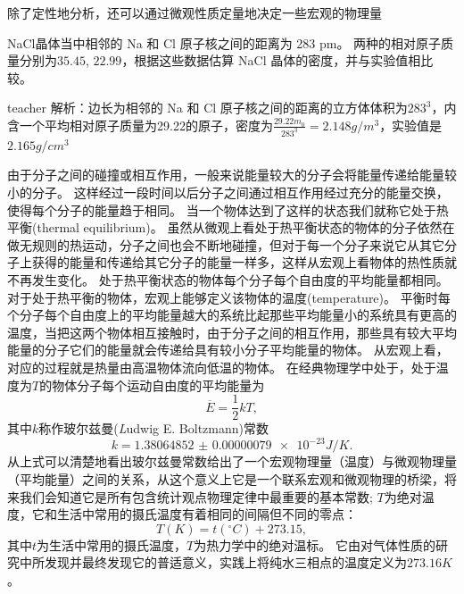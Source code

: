 除了定性地分析，还可以通过微观性质定量地决定一些宏观的物理量
\begin{example}
NaCl晶体当中相邻的 Na 和 Cl 原子核之间的距离为 283 pm。
两种的相对原子质量分别为$35.45$, $22.99$，根据这些数据估算 NaCl 晶体的密度，并与实验值相比较。
\begin{taggedblock}{teacher}
\newline
解析：边长为相邻的 Na 和 Cl 原子核之间的距离的立方体体积为$283^3$，内含一个平均相对原子质量为29.22的原子，密度为$\frac{29.22m_0}{283^3}=2.148g/m^3$，实验值是$2.165g/cm^3$
\end{taggedblock}
\end{example}

由于分子之间的碰撞或相互作用，一般来说能量较大的分子会将能量传递给能量较小的分子。
这样经过一段时间以后分子之间通过相互作用经过充分的能量交换，使得每个分子的能量趋于相同。
当一个物体达到了这样的状态我们就称它处于{\heiti 热平衡}(thermal equilibrium)。
虽然从微观上看处于热平衡状态的物体的分子依然在做无规则的热运动，分子之间也会不断地碰撞，但对于每一个分子来说它从其它分子上获得的能量和传递给其它分子的能量一样多，这样从宏观上看物体的热性质就不再发生变化。
处于热平衡状态的物体每个分子每个自由度的平均能量都相同。
对于处于热平衡的物体，宏观上能够定义该物体的{\heiti 温度}(temperature)。
平衡时每个分子每个自由度上的平均能量越大的系统比起那些平均能量小的系统具有更高的温度，当把这两个物体相互接触时，由于分子之间的相互作用，那些具有较大平均能量的分子它们的能量就会传递给具有较小分子平均能量的物体。
从宏观上看，对应的过程就是热量由高温物体流向低温的物体。
在经典物理学中处于，处于温度为$T$的物体分子每个运动自由度的平均能量为
\begin{equation}
\overline{E} = \frac{1}{2}kT,
\end{equation}
其中$k$称作玻尔兹曼({\textit Ludwig E. Boltzmann})常数
\begin{equation}\label{eqn: thermol-boltzmann-const}
k = \num{1.38064852(79)e-23}\si{J/K}.
\end{equation}
从上式可以清楚地看出玻尔兹曼常数给出了一个宏观物理量（温度）与微观物理量（平均能量）之间的关系，从这个意义上它是一个联系宏观和微观物理的桥梁，将来我们会知道它是所有包含统计观点物理定律中最重要的基本常数;
$T$为绝对温度，它和生活中常用的摄氏温度有着相同的间隔但不同的零点：
\begin{equation}\label{key}
T(\si{K}) = t(\si{^\circ C})+273.15,
\end{equation}
其中$t$为生活中常用的摄氏温度，$T$为热力学中的绝对温标。
它由对气体性质的研究中所发现并最终发现它的普适意义，实践上将纯水三相点的温度定义为$273.16\si{K}$。









